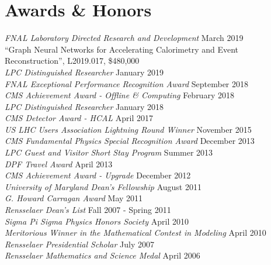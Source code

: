 \section{Awards \& Honors}
{\sl FNAL Laboratory Directed Research and Development} \hfill March 2019\\
``Graph Neural Networks for Accelerating Calorimetry and Event Reconstruction'', L2019.017, \$480,000\\
{\sl LPC Distinguished Researcher} \hfill January 2019\\
{\sl FNAL Exceptional Performance Recognition Award} \hfill September 2018\\
{\sl CMS Achievement Award - Offline \& Computing} \hfill February 2018\\
{\sl LPC Distinguished Researcher} \hfill January 2018\\
{\sl CMS Detector Award - HCAL } \hfill April 2017\\
{\sl US LHC Users Association Lightning Round Winner} \hfill November 2015\\
{\sl CMS Fundamental Physics Special Recognition Award} \hfill December 2013\\
\ifdefined\longflag
{\sl LPC Guest and Visitor Short Stay Program} \hfill Summer 2013\\
{\sl DPF Travel Award} \hfill April 2013\\
\fi
{\sl CMS Achievement Award - Upgrade} \hfill December 2012\\
{\sl University of Maryland Dean's Fellowship} \hfill August 2011\\
{\sl G. Howard Carragan Award} \hfill May 2011\\
{\sl Rensselaer Dean's List} \hfill Fall 2007 - Spring 2011\\
{\sl Sigma Pi Sigma Physics Honors Society} \hfill April 2010\\
{\sl Meritorious Winner in the Mathematical Contest in Modeling} \hfill April 2010\\
{\sl Rensselaer Presidential Scholar} \hfill July 2007\\
{\sl Rensselaer Mathematics and Science Medal} \hfill April 2006%
